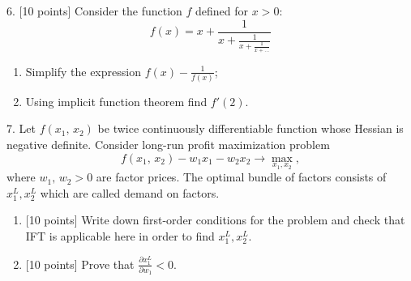 \documentclass[12pt,a4paper]{article}
\begin{document}
\newpage
{}
6. {[10 points]} Consider the function $f$ defined for $x>0$:
\[
f(x) = x + \frac{1}{x + \frac{1}{x + \frac{1}{x + \ldots}}}
\]
\begin{enumerate}
  \item Simplify the expression $f(x) - \frac{1}{f(x)}$;
  \item Using implicit function theorem find $f'(2)$.
\end{enumerate}



\newpage
{}

7. Let $f({x_1},\,{x_2})$ be twice continuously differentiable function whose Hessian is negative definite. Consider long-run profit maximization problem
\[
f({x_1},\,{x_2}) - {w_1}{x_1} - {w_2}{x_2} \to \max_{x_1, x_2},
\]
where ${w_1},\,{w_2} > 0$ are factor prices. The optimal bundle of factors consists of $x_1^L, x_2^L$ which are called demand on factors.
\begin{enumerate}
\item {[10 points]} Write down first-order conditions for the problem and check that IFT is applicable here in order to find $x_1^L, x_2^L$.
\item {[10 points]} Prove that $\frac{{\partial x_1^L}}{{\partial {w_1}}} < 0$.
\end{enumerate}

\newpage
{}
\end{document}
